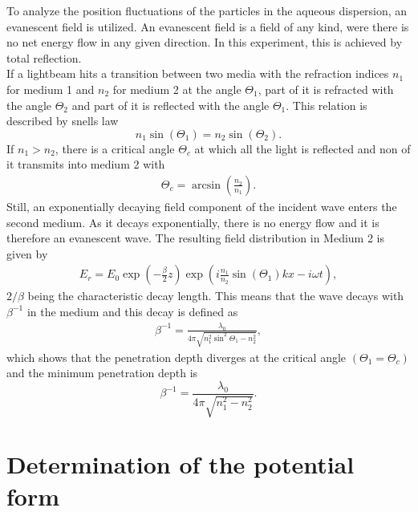 \documentclass[.../bericht]{subfilies}
\begin{document}
        To analyze the position fluctuations of the particles in the aqueous dispersion, an evanescent field is utilized. An evanescent field is a field of any kind, were there is no net energy flow in any given direction. In this experiment, this is achieved by total reflection. \\
        If  a lightbeam hits a transition between two media with the refraction indices $n_1$ for medium 1 and $n_2$ for medium 2 at the angle $\Theta_1$, part of it is refracted with the angle $\Theta_2$ and part of it is reflected with the angle $\Theta_1$. This relation is described by snells law
        \begin{equation*}
          n_1 \sin(\Theta_1)=n_2 \sin(\Theta_2).
        \end{equation*}
        If $n_1>n_2$, there is a critical angle $\Theta_c$ at which all the light is reflected and non of it transmits into medium 2 with
        \begin{align*}
          \Theta_c=\arcsin\left(\frac{n_2}{n_1}\right).
        \end{align*}
        Still, an exponentially decaying field component of the incident wave enters the second medium. As it decays exponentially, there is no energy flow and it is therefore an evanescent wave. The resulting field distribution in Medium 2 is given by
        \begin{align*}
          E_r=E_0 \exp\left( -\frac{\beta}{2}z \right) \exp\left( i\frac{n_1}{n_2}\sin(\Theta_1)kx-i\omega t \right),
        \end{align*}
        $2/\beta$ being the characteristic decay length. This means that the wave decays with $\beta^{-1}$ in the medium and this decay is defined as
        \begin{align*}
          \beta^{-1}=\frac{\lambda_0}{4 \pi \sqrt{n_1^2 \sin^2\Theta_1-n_2^2}},
        \end{align*}
        which shows that the penetration depth diverges at the critical angle $(\Theta_1=\Theta_c)$ and the minimum penetration depth is
        \begin{equation*}
          \beta^{-1}=\frac{\lambda_0}{4 \pi \sqrt{n_1^2-n_2^2}}.
        \end{equation*}
        \cite{helden}


      \section{Determination of the potential form}
      \label{sec:determination}
\end{document}
